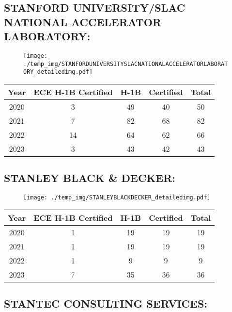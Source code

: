 \documentclass{article}%
\begin{document}
%
\newpage%
\subsection{STANFORD UNIVERSITY/SLAC NATIONAL ACCELERATOR LABORATORY:}%
\label{subsec:STANFORDUNIVERSITY/SLACNATIONALACCELERATORLABORATORY}%
\label{STANFORDUNIVERSITYSLACNATIONALACCELERATORLABORATORYdetailed}%


\begin{figure}[htbp]%
\centering%
\texttt{[image: ./temp\_img/STANFORDUNIVERSITYSLACNATIONALACCELERATORLABORATORY\_detailedimg.pdf]}%
\end{figure}

%
\begin{longtable}{c|c|c|c|c}%
\hline%
Year&ECE H{-}1B Certified&H{-}1B&Certified&Total\\%
\hline%
2020&3&49&40&50\\%
\hline%
2021&7&82&68&82\\%
\hline%
2022&14&64&62&66\\%
\hline%
2023&3&43&42&43\\%
\hline%
\end{longtable}

%
\newpage%
\subsection{STANLEY BLACK \& DECKER:}%
\label{subsec:STANLEYBLACKDECKER}%
\label{STANLEYBLACKDECKERdetailed}%


\begin{figure}[htbp]%
\centering%
\texttt{[image: ./temp\_img/STANLEYBLACKDECKER\_detailedimg.pdf]}%
\end{figure}

%
\begin{longtable}{c|c|c|c|c}%
\hline%
Year&ECE H{-}1B Certified&H{-}1B&Certified&Total\\%
\hline%
2020&1&19&19&19\\%
\hline%
2021&1&19&19&19\\%
\hline%
2022&1&9&9&9\\%
\hline%
2023&7&35&36&36\\%
\hline%
\end{longtable}

%
\newpage%
\subsection{STANTEC CONSULTING SERVICES:}%
\label{subsec:STANTECCONSULTINGSERVICES}%
\label{STANTECCONSULTINGSERVICESdetailed}%
\end{document}

